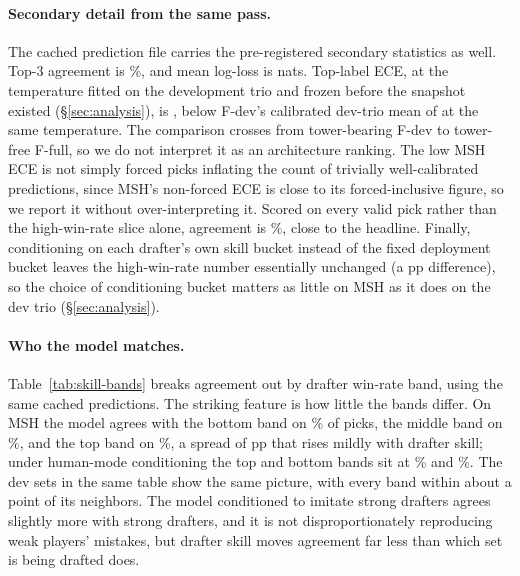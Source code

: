 \paragraph{Secondary detail from the same pass.}
The cached prediction file carries the pre-registered secondary
statistics as well. Top-3 agreement is \FfullMshTopThree\%, and mean
log-loss is \FfullMshLogLoss{} nats. Top-label ECE, at the temperature
fitted on the development trio and frozen before the snapshot existed
(\S\ref{sec:analysis}), is \FfullMshEce{}, below F-dev's calibrated
dev-trio mean of \DevMeanEceAtFrozenT{} at the same temperature. The
comparison crosses from tower-bearing F-dev to tower-free F-full, so we do
not interpret it as an architecture ranking. The low MSH ECE is not simply forced picks
inflating the count of trivially well-calibrated predictions, since
MSH's non-forced ECE is close to its forced-inclusive figure, so we
report it without over-interpreting it. Scored on every valid pick
rather than the high-win-rate slice alone, agreement is
\FfullMshAllUsers\%, close to the headline. Finally, conditioning on
each drafter's own skill bucket instead of the fixed deployment bucket
leaves the high-win-rate number essentially unchanged (a
\FfullMshSkillGap{}pp difference), so the choice of conditioning bucket
matters as little on MSH as it does on the dev trio
(\S\ref{sec:analysis}).

\begin{table}[t]
  \centering
  \caption{Top-1 agreement (\%) by drafter win-rate band (bottom below
  0.50, middle 0.50--0.55, top 0.55 and above), deployment mode, on the
  three development sets and MSH, all computed from cached predictions.}
  \label{tab:skill-bands}
  \small
  
\end{table}

\paragraph{Who the model matches.}
Table~\ref{tab:skill-bands} breaks agreement out by drafter win-rate
band, using the same cached predictions. The striking feature is how
little the bands differ. On MSH the model agrees with the bottom band on
\SkillBandBotMsh\% of picks, the middle band on \SkillBandMidMsh\%, and
the top band on \SkillBandTopMsh\%, a spread of \SkillBandGapMsh{}pp
that rises mildly with drafter skill; under human-mode conditioning the
top and bottom bands sit at \SkillBandTopMshHuman\% and
\SkillBandBotMshHuman\%. The dev sets in the same table show the same
picture, with every band within about a point of its neighbors. The
model conditioned to imitate strong drafters agrees slightly more with
strong drafters, and it is not disproportionately reproducing weak
players' mistakes, but drafter skill moves agreement far less than which
set is being drafted does.


